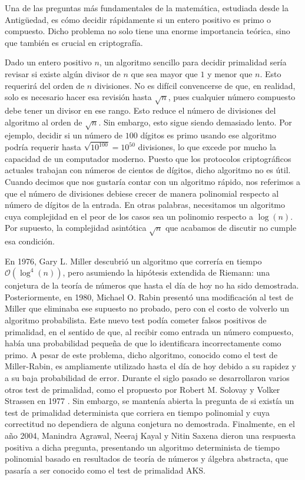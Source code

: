Una de las preguntas más fundamentales de la matemática, estudiada desde la Antigüedad, es cómo decidir rápidamente si un entero positivo es primo o compuesto. Dicho problema no solo tiene una enorme importancia teórica, sino que también es crucial en criptografía.

Dado un entero positivo $n$, un algoritmo sencillo para decidir primalidad sería revisar si existe algún divisor de $n$ que sea mayor que $1$ y menor que $n$. Esto requerirá del orden de $n$ divisiones. No es difícil convencerse de que, en realidad, solo es necesario hacer esa revisión hasta $\sqrt{n}$, pues cualquier número compuesto debe tener un divisor en ese rango. Esto reduce el número de divisiones del algoritmo al orden de $\sqrt{n}$. Sin embargo, esto sigue siendo demasiado lento. Por ejemplo, decidir si un número de $100$ dígitos es primo usando ese algoritmo podría requerir hasta $\sqrt{10^{100}} = 10^{50}$ divisiones, lo que excede por mucho la capacidad de un computador moderno. Puesto que los protocolos criptográficos actuales trabajan con números de cientos de dígitos, dicho algoritmo no es útil. Cuando decimos que nos gustaría contar con un algoritmo rápido, nos referimos a que el número de divisiones debiese crecer de manera polinomial respecto al número de dígitos de la entrada. En otras palabras, necesitamos un algoritmo cuya complejidad en el peor de los casos sea un polinomio respecto a $\log(n)$. Por supuesto, la complejidad asintótica $\sqrt{n}$ que acabamos de discutir no cumple esa condición.

En 1976, Gary L. Miller \cite{MR480295} descubrió un algoritmo que correría en tiempo $\mathcal{O}\left(\log^4(n) \right)$, pero asumiendo la hipótesis extendida de Riemann: una conjetura de la teoría de números que hasta el día de hoy no ha sido demostrada. Posteriormente, en 1980, Michael O. Rabin \cite{MR566880} presentó una modificación al test de Miller que eliminaba ese supuesto no probado, pero con el costo de volverlo un algoritmo probabilista. Este nuevo test podía cometer falsos positivos de primalidad, en el sentido de que, al recibir como entrada un número compuesto, había una probabilidad pequeña de que lo identificara incorrectamente como primo. A pesar de este problema, dicho algoritmo, conocido como el test de Miller-Rabin, es ampliamente utilizado hasta el día de hoy debido a su rapidez y a su baja probabilidad de error. Durante el siglo pasado se desarrollaron varios otros test de primalidad, como el propuesto por Robert M. Solovay y Volker Strassen en 1977 \cite{MR429721}. Sin embargo, se mantenía abierta la pregunta de si existía un test de primalidad determinista que corriera en tiempo polinomial y cuya correctitud no dependiera de alguna conjetura no demostrada.
Finalmente, en el año 2004, Manindra Agrawal, Neeraj Kayal y Nitin Saxena \cite{AKS04} dieron una respuesta positiva a dicha pregunta, presentando un algoritmo determinista de tiempo polinomial basado en resultados de teorí­a de números y álgebra abstracta, que pasaría a ser conocido como el test de primalidad AKS.

